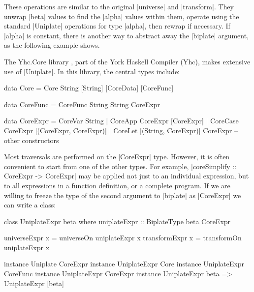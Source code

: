 
These operations are similar to the original |universe| and |transform|. They unwrap |beta| values to find the |alpha| values within them, operate using the standard |Uniplate| operations for type |alpha|, then rewrap if necessary. If |alpha| is constant, there is another way to abstract away the |biplate| argument, as the following example shows.

\begin{example}
The Yhc.Core library \citep{me:yhc_core}, part of the York Haskell Compiler (Yhc), makes extensive use of |Uniplate|. In this library, the central types include:

\begin{comment}
\begin{code}
data CoreData = CoreData
\end{code}
\end{comment}

\begin{code}
data Core      =  Core String [String] [CoreData] [CoreFunc]

data CoreFunc  =  CoreFunc String String CoreExpr

data CoreExpr  =  CoreVar   String
               |  CoreApp   CoreExpr  [CoreExpr]
               |  CoreCase  CoreExpr  [(CoreExpr, CoreExpr)]
               |  CoreLet   [(String, CoreExpr)] CoreExpr
                  -- other constructors
\end{code}

Most traversals are performed on the |CoreExpr| type. However, it is often convenient to start from one of the other types. For example, |coreSimplify :: CoreExpr -> CoreExpr| may be applied not just to an individual expression, but to all expressions in a function definition, or a complete program. If we are willing to freeze the type of the second argument to |biplate| as |CoreExpr| we can write a class:

\begin{code}
class  UniplateExpr beta where
       uniplateExpr :: BiplateType beta CoreExpr

universeExpr   x = universeOn   uniplateExpr x
transformExpr  x = transformOn  uniplateExpr x

instance Uniplate CoreExpr
instance UniplateExpr Core
instance UniplateExpr CoreFunc
instance UniplateExpr CoreExpr
instance UniplateExpr beta => UniplateExpr [beta]
\end{code}\codeexample
\end{example}
\bigskip

